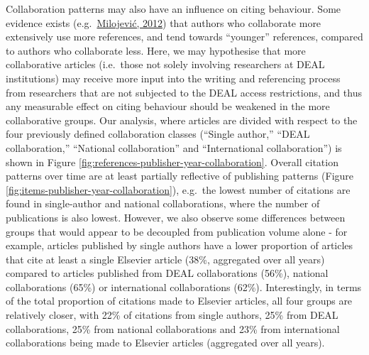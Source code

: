 \documentclass[
]{article}
\begin{document}
Collaboration patterns may also have an influence on citing behaviour. Some evidence exists (e.g.~\href{https://doi.org/10.1371/journal.pone.0049176}{Milojević, 2012}) that authors who collaborate more extensively use more references, and tend towards ``younger'' references, compared to authors who collaborate less. Here, we may hypothesise that more collaborative articles (i.e.~those not solely involving researchers at DEAL institutions) may receive more input into the writing and referencing process from researchers that are not subjected to the DEAL access restrictions, and thus any measurable effect on citing behaviour should be weakened in the more collaborative groups. Our analysis, where articles are divided with respect to the four previously defined collaboration classes (``Single author,'' ``DEAL collaboration,'' ``National collaboration'' and ``International collaboration'') is shown in Figure \ref{fig:references-publisher-year-collaboration}. Overall citation patterns over time are at least partially reflective of publishing patterns (Figure \ref{fig:items-publisher-year-collaboration}), e.g.~the lowest number of citations are found in single-author and national collaborations, where the number of publications is also lowest. However, we also observe some differences between groups that would appear to be decoupled from publication volume alone - for example, articles published by single authors have a lower proportion of articles that cite at least a single Elsevier article (38\%, aggregated over all years) compared to articles published from DEAL collaborations (56\%), national collaborations (65\%) or international collaborations (62\%). Interestingly, in terms of the total proportion of citations made to Elsevier articles, all four groups are relatively closer, with 22\% of citations from single authors, 25\% from DEAL collaborations, 25\% from national collaborations and 23\% from international collaborations being made to Elsevier articles (aggregated over all years).
\end{document}
